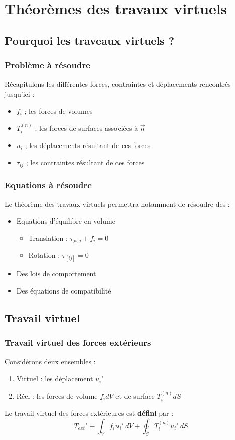 \chapter{Théorèmes des travaux virtuels}
\section{Pourquoi les traveaux virtuels ?}
\subsection{Problème à résoudre}
Récapitulons les différentes forces, contraintes et déplacements rencontrés
jusqu'ici :
\begin{itemize}
	\item $f_i$ ; les forces de volumes
	\item $T_i^{(n)}$ ; les forces de surfaces associées à $\vec{n}$
	\item $u_i$ ; les déplacements résultant de ces forces
	\item $\tau_{ij}$ ; les contraintes résultant de ces forces	
\end{itemize}
	
\subsection{Equations à résoudre}
Le théorème des travaux virtuels permettra notamment de résoudre des :
\begin{itemize}
	\item Equations d'équilibre en volume 
	      \begin{itemize}
	      	\item Translation : $\tau_{ji,j} + f_i = 0$
	      	\item Rotation : $\tau_{[ij]} = 0$
	      \end{itemize}
	\item Des lois de comportement
	\item Des équations de compatibilité
\end{itemize}
	
\section{Travail virtuel}
\subsection{Travail virtuel des forces extérieurs}
Considérons deux ensembles : 
\begin{enumerate}
	\item Virtuel : les déplacement $u_i'$
	\item Réel : les forces de volume $f_idV$ et de surface $T_i^{(n)}dS$
\end{enumerate}
Le travail virtuel des forces extérieures est \textbf{défini} par :
\begin{equation}
	T_{ext}' \equiv \int_V f_iu_i'\ dV + \oint_S T_i^{(n)}u_i'\ dS
\end{equation}
	
